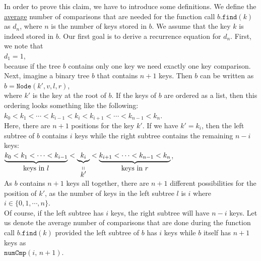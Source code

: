 In order to prove this claim, we have to introduce some definitions.
We define the \underline{avera}g\underline{e} number of comparisons that are needed for the function
call $b.\texttt{find}(k)$ as  $d_n$, where $n$ is the number of keys stored in $b$.  We assume that
the key $k$ is indeed stored in $b$.  Our first goal is to derive a recurrence equation for 
$d_n$.  First, we note that  
\\[0.2cm]
\hspace*{1.3cm} $d_1 = 1$,
\\[0.2cm]
because if the tree $b$ contains only one key we need exactly one key comparison.
Next, imagine a binary tree $b$ that contains $n+1$ keys.  Then $b$
can be written as 
\\[0.2cm]
\hspace*{1.3cm}
$b = \texttt{Node}(k',v,l,r)$,
\\[0.2cm]
where $k'$ is the key at the root of $b$.  If the keys of $b$ are ordered as a list, then this
ordering looks something like the following:
\\[0.2cm]
\hspace*{1.3cm}
$k_0 < k_1 < \cdots < k_{i-1} < k_{i} < k_{i+1} < \cdots < k_{n-1} < k_n$.
\\[0.2cm]
Here, there are $n+1$ positions for the key $k'$.
If we have $k' = k_i$, then the left subtree of $b$ contains  $i$ keys while the right subtree
contains the remaining  $n-i$ keys:
\\[0.2cm]
\hspace*{1.3cm}
$\underbrace{k_0 < k_1 < \cdots < k_{i-1}}_{\mbox{keys in $l$}} < 
 \underbrace{k_{i}}_{\stackrel{\displaystyle \shortparallel}{\displaystyle k'}} < 
 \underbrace{k_{i+1} < \cdots < k_{n-1} < k_n}_{\mbox{keys in $r$}}$,
\\[0.2cm]
As  $b$ contains $n+1$ keys all together, there are  $n+1$ different possibilities for the position
of $k'$, as the number of keys in the left subtree $l$ is $i$ where
\\[0.2cm]
\hspace*{1.3cm}
 $i \in \{0,1, \cdots, n\}$.
\\[0.2cm]
Of course, if the left subtree has $i$ keys, the right subtree will have $n-i$ keys.
Let us denote the average number of comparisons that are done during the function call
$b.\texttt{find}(k)$ provided the left subtree of $b$ has $i$ keys while $b$ itself has $n+1$ keys
as
\\[0.2cm]
\hspace*{1.3cm}
$\texttt{numCmp}(i,\, n\!+\!1)$.
